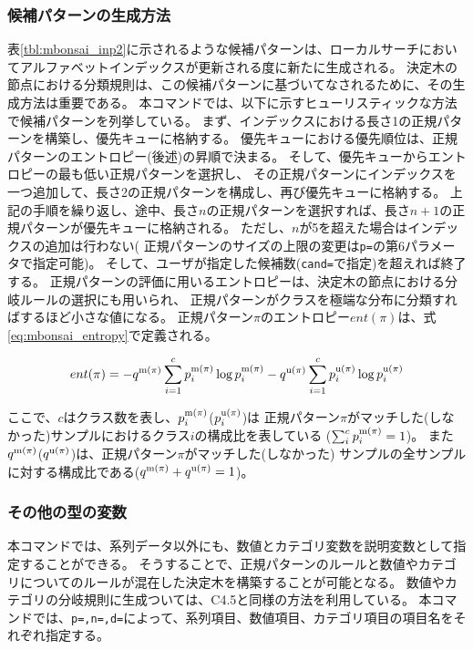 \subsubsection{候補パターンの生成方法}
表\ref{tbl:mbonsai_inp2}に示されるような候補パターンは、ローカルサーチにおいてアルファベットインデックスが更新される度に新たに生成される。
決定木の節点における分類規則は、この候補パターンに基づいてなされるために、その生成方法は重要である。
本コマンドでは、以下に示すヒューリスティックな方法で候補パターンを列挙している。
まず、インデックスにおける長さ1の正規パターンを構築し、優先キューに格納する。
優先キューにおける優先順位は、正規パターンのエントロピー(後述)の昇順で決まる。
そして、優先キューからエントロピーの最も低い正規パターンを選択し、
その正規パターンにインデックスを一つ追加して、長さ2の正規パターンを構成し、再び優先キューに格納する。
上記の手順を繰り返し、途中、長さ$n$の正規パターンを選択すれば、長さ$n+1$の正規パターンが優先キューに格納される。
ただし、$n$が5を超えた場合はインデックスの追加は行わない(
正規パターンのサイズの上限の変更は\verb|p=|の第6パラメータで指定可能)。
そして、ユーザが指定した候補数(\verb|cand=|で指定)を超えれば終了する。
正規パターンの評価に用いるエントロピーは、決定木の節点における分岐ルールの選択にも用いられ、
正規パターンがクラスを極端な分布に分類すればするほど小さな値になる。
正規パターン$\pi$のエントロピー$ent(\pi)$は、式\ref{eq:mbonsai_entropy}で定義される。

\begin{equation}
ent(\pi)=-q^{{\rm m}(\pi)}\sum_{i=1}^c p_i^{{\rm m}(\pi)} \log p_i^{{\rm m}(\pi)}
            -q^{{\rm u}(\pi)}\sum_{i=1}^c p_i^{{\rm u}(\pi)} \log p_i^{{\rm u}(\pi)}
\label{eq:mbonsai_entropy}
\end{equation}

ここで、$c$はクラス数を表し、$p_i^{{\rm m}(\pi)}$($p_i^{{\rm u}(\pi)}$)は
正規パターン$\pi$がマッチした(しなかった)サンプルにおけるクラス$i$の構成比を表している
($\sum_i^c p_i^{{\rm m}(\pi)}=1$)。
また$q^{{\rm m}(\pi)}$($q^{{\rm u}(\pi)}$)は、正規パターン$\pi$がマッチした(しなかった)
サンプルの全サンプルに対する構成比である($q^{{\rm m}(\pi)}+q^{{\rm u}(\pi)}=1$)。

\subsubsection{その他の型の変数}
本コマンドでは、系列データ以外にも、数値とカテゴリ変数を説明変数として指定することができる。
そうすることで、正規パターンのルールと数値やカテゴリについてのルールが混在した決定木を構築することが可能となる。
数値やカテゴリの分岐規則に生成ついては、C4.5と同様の方法を利用している\cite{Quinlan93}。
本コマンドでは、\verb|p=,n=,d=|によって、系列項目、数値項目、カテゴリ項目の項目名をそれぞれ指定する。

